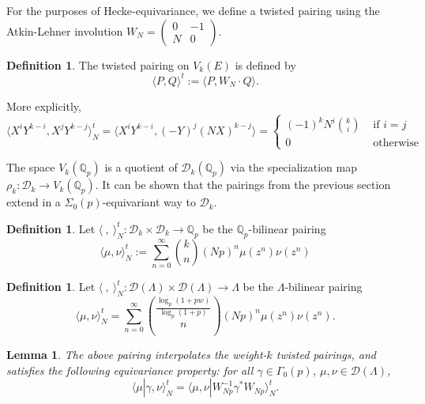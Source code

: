 \documentclass[10pt]{amsart}
\theoremstyle{plain}
\newtheorem{lemma}[theorem]{Lemma}
\theoremstyle{definition}
\newtheorem{definition}[theorem]{Definition}
\newcommand{\QQ}{{\mathbb{Q}}}
\newcommand{\cD}{\mathcal{D}}
\begin{document}
For the purposes of Hecke-equivariance, we define a twisted pairing using the Atkin-Lehner involution $W_N = \begin{pmatrix} 0 & -1 \\ N & 0 \end{pmatrix}$.
\begin{definition}
The twisted pairing on $V_k(E)$ is defined by
\begin{equation}
	\langle P, Q\rangle^t := \langle P, W_N \cdot Q\rangle.
\end{equation}
\end{definition}
More explicitly,
\begin{equation*}
	\langle X^iY^{k-i}, X^j Y^{k-j} \rangle_N^t = \langle X^i Y^{k-i}, (-Y)^j(NX)^{k-j}\rangle= \begin{cases} (-1)^k N^i {k \choose i} & \text{ if } i=j\\
												0	& \text{ otherwise} \end{cases}
\end{equation*}

The space $V_k(\QQ_p)$ is a quotient of $\cD_k(\QQ_p)$ via the specialization map $\rho_k: \cD_k\rightarrow V_k(\QQ_p)$. It can be shown that the pairings from the previous section extend in a $\Sigma_0(p)$-equivariant way to $\cD_k$. %

\begin{definition}
Let $\langle~,~\rangle^t_N : \cD_k\times\cD_k\longrightarrow \QQ_p$ be the $\QQ_p$-bilinear pairing
\begin{equation}
	\langle \mu, \nu \rangle_N^t := \sum_{n=0}^\infty {k \choose n} (Np)^n \mu(z^n)\nu(z^n)
\end{equation}
\end{definition}




\begin{definition}
Let $\langle ~, ~\rangle^t_N :\cD(\Lambda)\times\cD(\Lambda) \longrightarrow \Lambda$ be the $\Lambda$-bilinear pairing
\begin{equation}
	\langle \mu, \nu \rangle_N^t = \sum_{n=0}^\infty {\frac{\log_p(1+pw)}{\log_p(1+p)} \choose n} (Np)^n \mu(z^n)\nu(z^n).
\end{equation}
\end{definition}

\begin{lemma}
The above pairing interpolates the weight-$k$ twisted pairings, and satisfies the following equivariance property: for all $\gamma \in\Gamma_0(p)$, $\mu,\nu\in \cD(\Lambda)$, 
\begin{equation}
	\langle \mu | \gamma, \nu\rangle_N^t  = \langle \mu, \nu| W_{Np}^{-1}\gamma^* W_{Np}\rangle_N^t.
\end{equation}	
\end{lemma}
\end{document}
